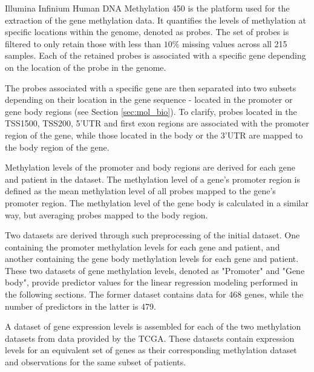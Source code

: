 Illumina Infinium Human DNA Methylation 450 is the platform used for the extraction of the gene methylation data. It quantifies the levels of methylation at specific locations within the genome, denoted as probes. The set of probes is filtered to only retain those with less than $10\%$ missing values across all 215 samples. Each of the retained probes is associated with a specific gene depending on the location of the probe in the genome.

The probes associated with a specific gene are then separated into two subsets depending on their location in the gene sequence - located in the promoter or gene body regions (see Section \ref{sec:mol_bio}). To clarify, probes located in the TSS1500, TSS200, 5'UTR and first exon regions are associated with the promoter region of the gene, while those located in the body or the 3'UTR are mapped to the body region of the gene.

Methylation levels of the promoter and body regions are derived for each gene and patient in the dataset. The methylation level of a gene's promoter region is defined as the mean methylation level of all probes mapped to the gene's promoter region. The methylation level of the gene body is calculated in a similar way, but averaging probes mapped to the body region.

Two datasets are derived through such preprocessing of the initial dataset. One containing the promoter methylation levels for each gene and patient, and another containing the gene body methylation levels for each gene and patient. These two datasets of gene methylation levels, denoted as "Promoter" and "Gene body", provide predictor values for the linear regression modeling performed in the following sections. The former dataset contains data for 468 genes, while the number of predictors in the latter is 479. 

A dataset of gene expression levels is assembled for each of the two methylation datasets from data provided by the TCGA. These datasets contain expression levels for an equivalent set of genes as their corresponding methylation dataset and observations for the same subset of patients.




